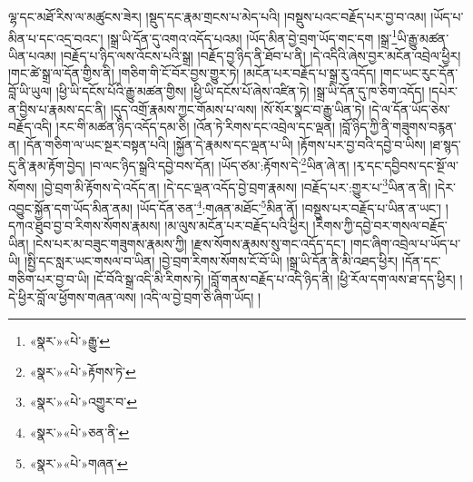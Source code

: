 ལྷ་དང་མཐོ་རིས་ལ་མཚུངས་ཟེར། །སྡུད་དང་རྣམ་གྲངས་པ་མེད་པའི། །བསྡུས་པའང་བརྗོད་པར་བྱ་བ་འམ། །ཡོད་པ་མིན་པ་དང་འདྲ་བའང་། །སྒྲ་ཡི་དོན་དུ་འགའ་འདོད་པའམ། །ཡོད་མིན་བྱེ་བྲག་ཡོད་གང་དག །སྒྲ་\footnote{«སྣར་»«པེ་»རྒྱུ་}ཡི་རྒྱུ་མཚན་ཡིན་པའམ། །བརྗོད་པ་ཉིད་ལས་འོངས་པའི་སྒྲ། །བརྗོད་བྱ་ཉིད་ནི་ཐོབ་པ་ནི། །དེ་འདིའི་ཞེས་བྱར་མངོན་འབྲེལ་ཕྱིར། །གང་ཚེ་སྒྲ་ལ་དོན་གྱིས་ནི། །གཅིག་གི་ངོ་བོར་བྱས་གྱུར་ཏེ། །མངོན་པར་བརྗོད་པ་སྒྲ་རུ་འདོད། །གང་ཡང་རུང་དོན་བློ་ཡི་ཡུལ། །ཕྱི་ཡི་དངོས་པོའི་རྒྱུ་མཚན་གྱིས། །ཕྱི་ཡི་དངོས་པོ་ཞེས་འཛིན་ཏེ། །སྒྲ་ཡི་དོན་དུ་ཁ་ཅིག་འདོད། །དཔེར་ན་བྱིས་པ་རྣམས་དང་ནི། །དུད་འགྲོ་རྣམས་ཀྱང་གོམས་པ་ལས། །སོ་སོར་སྣང་བ་རྒྱུ་ཡིན་ཏེ། །དེ་ལ་དོན་ཡོད་ཅེས་བརྗོད་འདི། །རང་གི་མཚན་ཉིད་འདོད་དམ་ཅི། །འོན་ཏེ་རིགས་དང་འབྲེལ་དང་ལྡན། །བློ་ཉིད་ཀྱི་ནི་གཟུགས་བརྙན་ན། །དོན་གཅིག་ལ་ཡང་སྔར་བསྟན་པའི། །སྐྱོན་དེ་རྣམས་དང་ལྡན་པ་ཡི། །རྟོགས་པར་བྱ་བའི་དབྱེ་བ་ཡིས། །ཐ་སྙད་དུ་ནི་རྣམ་རྟོག་བྱེད། །བ་ལང་ཉིད་སྒྲའི་དབྱེ་བས་དོན། །ཡོད་ཙམ་:རྟོགས་དེ་\footnote{«སྣར་»«པེ་»རྟོགས་ཏེ་}ཡིན་ཞེ་ན། །རྭ་དང་དབྱིབས་དང་སྔོ་ལ་སོགས། །བྱེ་བྲག་མི་རྟོགས་དེ་འདོད་ན། །དེ་དང་ལྡན་འདོད་བྱེ་བྲག་རྣམས། །བརྗོད་པར་:གྱུར་པ་\footnote{«སྣར་»«པེ་»འགྱུར་བ་}ཡིན་ན་ནི། །དེར་འབྱུང་སྐྱོན་དག་ཡོད་མིན་ནམ། །ཡོད་དོན་ཅན་\footnote{«སྣར་»«པེ་»ཅན་ནི་}:གཞན་མཐོང་\footnote{«སྣར་»«པེ་»གཞན་}མིན་ནོ། །བསྡུས་པར་བརྗོད་པ་ཡིན་ན་ཡང་། །དཀའ་ཐུབ་བྱ་བ་རིགས་སོགས་རྣམས། །མ་ལུས་མངོན་པར་བརྗོད་པའི་ཕྱིར། །རིགས་ཀྱི་དབྱེ་བར་གསལ་བརྗོད་ཡིན། །ངེས་པར་མ་བཟུང་གཟུགས་རྣམས་ཀྱི། །རྫས་སོགས་རྣམས་སུ་གང་འདོད་དང་། །གང་ཞིག་འབྲེལ་པ་ཡོད་པ་ཡི། །སྤྱི་དང་སླར་ཡང་གསལ་བ་ཡིན། །བྱེ་བྲག་རིགས་སོགས་ངོ་བོ་ཡི། །སྒྲ་ཡི་དོན་ནི་མི་འཐད་ཕྱིར། །དོན་དང་གཅིག་པར་བྱ་བ་ཡི། །ངོ་བོའི་སྒྲ་འདི་མི་རིགས་ཏེ། །བློ་གནས་བརྗོད་པ་འདི་ཉིད་ནི། །ཕྱི་རོལ་དག་ལས་ཐ་དད་ཕྱིར། །དེ་ཕྱིར་བློ་ལ་ཕྱོགས་གཞན་ལས། །འདི་ལ་བྱེ་བྲག་ཅི་ཞིག་ཡོད། །
